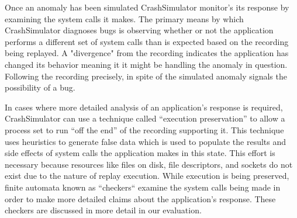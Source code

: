 Once an anomaly has been simulated CrashSimulator monitor's its response by
examining the system calls it makes.  The primary means by which
CrashSimulator diagnoses bugs is observing whether or not the application
performs a different set of system calls than is expected based on the
recording being replayed.  A "divergence" from the recording indicates
the application has changed its behavior meaning it it might be handling
the anomaly in question.  Following the recording precisely, in spite of
the simulated anomaly signals the possibility of a bug.

In cases where more detailed analysis of an application's response
is required, CrashSimulator can use a
technique called ``execution preservation'' to allow a process set to run
``off the end'' of the recording supporting it.  This technique uses
heuristics to generate false data which is used to populate the results and
side effects of system calls the application makes in this state.  This
effort is necessary because resources like files on disk, file descriptors,
and sockets do not exist due to the nature of replay execution.  While
execution is being preserved, finite automata known as ``checkers`` examine
the system calls being made in order to make more detailed claims about the
application's response.  These checkers are discussed in more detail in our
evaluation.
